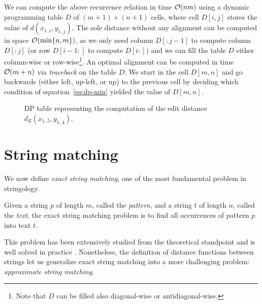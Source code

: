 We can compute the above recurrence relation in time $\mathcal{O}(nm)$ using a dynamic programming table $D$ of $(m+1) \times (n+1)$ cells, where cell $D[i,j]$ stores the value of $d(x_{1..i},y_{1..j})$.
The sole distance without any alignment can be computed in space $\mathcal{O}(\text{min}\{ n, m \})$, as we only need column $D[:j-1]$ to compute column $D[:j]$ (or row $D[i-1:]$ to compute $D[i:]$) and we can fill the table $D$ either column-wise or row-wise\footnote{Note that $D$ can be filled also diagonal-wise or antidiagonal-wise.}.
An optimal alignment can be computed in time $\mathcal{O}(m + n)$ via \emph{traceback} on the table $D$:
We start in the cell $D[m,n]$ and go backwards (either left, up-left, or up) to the previous cell by deciding which condition of equation~\ref{eq:dp-min} yielded the value of $D[m,n]$.

\begin{figure}[h]
\begin{center}
\caption[Example of DP table]{DP table representing the computation of the edit distance $d_E(x_{1..5}, y_{1..4})$.}
\label{fig:edit-dp}

\end{center}
\end{figure}



\section{String matching}


We now define \emph{exact string matching}, one of the most fundamental problem in stringology.
\begin{definition}
\citep{Gusfield1997}
Given a string $p$ of length $m$, called the \emph{pattern}, and a string $t$ of length $n$, called the \emph{text}, the exact string matching problem is to find all occurrences of pattern $p$ into text $t$.
\end{definition}

This problem has been extensively studied from the theoretical standpoint and is well solved in practice \citep{Faro2013}.
Nonetheless, the definition of distance functions between strings let us generalize exact string matching into a more challenging problem: \emph{approximate string matching}.

